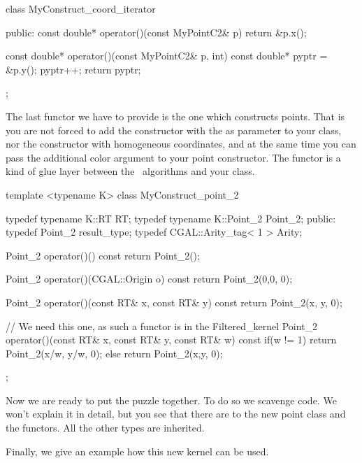 \ccHtmlLinksOff
\begin{ccExampleCode}
class MyConstruct_coord_iterator {
public:
  const double* operator()(const MyPointC2& p)
  {
    return &p.x();
  }

  const double* operator()(const MyPointC2& p, int)
  {
    const double* pyptr = &p.y();
    pyptr++;
    return pyptr;
  }
};
\end{ccExampleCode}
\ccHtmlLinksOn

The last functor we have to provide is the one which constructs
points. That is you are not forced to add the constructor 
with the  as parameter to your class, nor the constructor with 
homogeneous coordinates, and at the same time you can 
pass the additional color argument to your point constructor.
The functor is a kind of glue layer between the \cgal\ algorithms
and your class.

\ccHtmlLinksOff
\begin{ccExampleCode}
 template <typename K>
  class MyConstruct_point_2
  {
    typedef typename K::RT         RT;
    typedef typename K::Point_2    Point_2;
  public:
    typedef Point_2          result_type;
    typedef CGAL::Arity_tag< 1 >   Arity;

    Point_2
    operator()() const
    { return Point_2(); }

    Point_2
    operator()(CGAL::Origin o) const
    { return Point_2(0,0, 0); }

    Point_2
    operator()(const RT& x, const RT& y) const
    { return Point_2(x, y, 0); }

    
    // We need this one, as such a functor is in the Filtered_kernel
    Point_2
    operator()(const RT& x, const RT& y, const RT& w) const
    { 
      if(w != 1){
	return Point_2(x/w, y/w, 0); 
      } else {
	return Point_2(x,y, 0);
      }
    }
  };

\end{ccExampleCode}
\ccHtmlLinksOn


Now we are ready to put the puzzle together. To do so we
scavenge code. We won't explain it in detail, but you see
that there are  to the new point class and
the functors. All the other types are inherited.



\ccHtmlLinksOff


\ccHtmlLinksOn



Finally, we give an example how this new kernel can be used.


